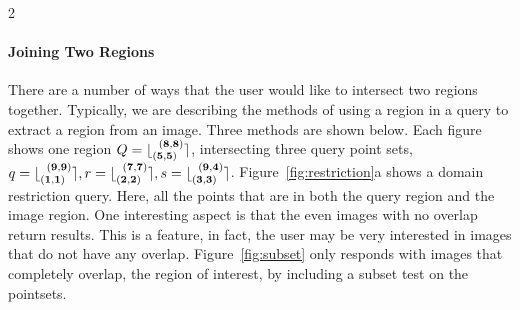 \documentclass[10pt,letter]{article}
\newcommand{\RPSnx}[2]{\lfloor_{\pt{#1}}^{\;\;\pt{#2}}\rceil}
\begin{document}
\begin{multicols}{2}
\paragraph{Joining Two Regions}

There are a number of ways that the user would like to intersect two
regions together. Typically, we are describing the methods of using a
region in a query to extract a region from an image.  Three methods
are shown below.  Each figure shows one region
$Q=\RPSnx{(5,5)}{(8,8)}$, intersecting three query point sets,
$q=\RPSnx{(1,1)}{(9,9)}, r=\RPSnx{(2,2)}{(7,7)},
s=\RPSnx{(3,3)}{(9,4)}$.  Figure~\ref{fig:restriction}a shows a domain
restriction query.  Here, all the points that are in both the query
region and the image region.  One interesting aspect is that the even
images with no overlap return results.  This is a feature, in fact,
the user may be very interested in images that do not have any
overlap.  Figure~\ref{fig:subset} only responds with images that
completely overlap, the region of interest, by including a subset test
on the pointsets.


\begin{figure*}[htbp]
  \centering
  \caption{Select g.id,$g.i|_Q$ from $g$}
  \label{fig:restriction}
\end{figure*} 

\begin{figure*}[htbp]
  \centering
  \caption{Select g.id,$g.i|_Q$ from $g$ where $g.i \subset Q$}
  \label{fig:subset}
\end{figure*} 



\end{multicols}
\end{document}
